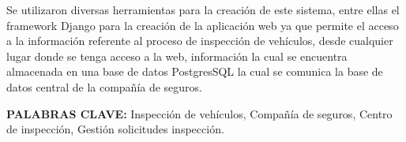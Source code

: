 Se utilizaron diversas herramientas para la creación de este sistema, entre ellas el framework Django para la creación de la aplicación web ya que permite el acceso a la información referente al proceso de inspección de vehículos, desde cualquier lugar donde se tenga acceso a la web, información la cual se encuentra almacenada en una base de datos PostgresSQL la cual se comunica la base de datos central de la compañía de seguros.

\begin{justify}
	\large{\textbf{PALABRAS CLAVE: }}Inspección de vehículos, Compañía de seguros, Centro de inspección, Gestión solicitudes inspección.
\end{justify}